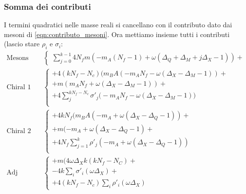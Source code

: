 \documentclass[a4paper,12pt]{article}
\begin{document}
\subsubsection{Somma dei contributi}


I termini quadratici nelle masse reali si cancellano con il contributo dato dai mesoni di \ref{eqn:contributo_mesoni}.
Ora mettiamo insieme tutti i contributi (lascio stare $\rho_i$ e $\sigma_i$:
\begin{align*}
\mbox{Mesons}  &\begin{cases}
\sum_{j=0}^{k-1} 4 N_f   m (- m_A (N_f - 1)  + \omega( \Delta_Q +  \Delta_M + j \Delta_X -1  )  ) + 
\end{cases}
\\
\mbox{Chiral 1}& \begin{cases}
+  4 ( k N_f - N_c ) \big(  m_B A (  -  m_A N_f - \omega( \Delta_X - \Delta_M - 1)) +\\
 +  m ( m_A N_f + \omega( \Delta_X - \Delta_M - 1)) + \\ 
   +  4 \sum_j^{k N_f - N_c} \sigma'_j \big( - m_A N_f -  \omega( \Delta_X - \Delta_M - 1) \big) \\
\end{cases}\\
\mbox{Chiral 2} & \begin{cases}
  +    4 k N_f \big(  m_B A (- m_A +  \omega ( \Delta_X - \Delta_Q - 1)) + \\
  +  m ( - m_A +  \omega ( \Delta_X - \Delta_Q - 1)+ \\
+  4 N_f \sum_{j=1}^k  \rho'_j ( - m_A +  \omega ( \Delta_X - \Delta_Q - 1) ) \\
\end{cases}\\
\mbox{Adj matter} & \begin{cases}
	+ m( 4 \omega \Delta_X k ( k N_f - N_C) +\\
	- 4 k \sum_i \sigma'_i (  \omega \Delta_X ) + \\
	+ 4 (k N_f - N_c)  \sum_i \rho'_i(  \omega \Delta_X ) 
\end{cases}
\end{align*}
\end{document}
